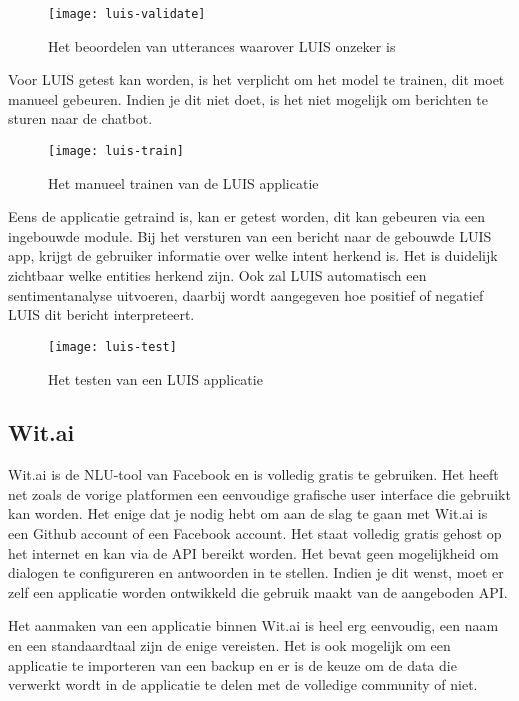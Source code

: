 \begin{figure}[H]
    \label{fig:luis-validate}
    \centering
    \texttt{[image: luis-validate]}
    \caption{Het beoordelen van utterances waarover LUIS onzeker is}
\end{figure}

Voor LUIS getest kan worden, is het verplicht om het model te trainen, dit moet manueel gebeuren. Indien je dit niet doet, is het niet mogelijk om berichten te sturen naar de chatbot.

\begin{figure}[H]
    \label{fig:luis-train}
    \centering
    \texttt{[image: luis-train]}
    \caption{Het manueel trainen van de LUIS applicatie}
\end{figure}

Eens de applicatie getraind is, kan er getest worden, dit kan gebeuren via een ingebouwde module. Bij het versturen van een bericht naar de gebouwde LUIS app, krijgt de gebruiker informatie over welke intent herkend is.
Het is duidelijk zichtbaar welke entities herkend zijn. Ook zal LUIS automatisch een sentimentanalyse uitvoeren, daarbij wordt aangegeven hoe positief of negatief LUIS dit bericht interpreteert.

\begin{figure}[H]
    \label{fig:luis-test}
    \centering
    \texttt{[image: luis-test]}
    \caption{Het testen van een LUIS applicatie}
\end{figure}

\subsection{Wit.ai}
\label{subsec:werking-platformen-wit}

Wit.ai is de NLU-tool van Facebook en is volledig gratis te gebruiken. Het heeft net zoals de vorige platformen een eenvoudige grafische user interface die gebruikt kan worden. Het enige dat je nodig hebt om aan de slag te gaan met Wit.ai is een Github account of een Facebook account. Het staat volledig gratis gehost op het internet en kan via de API bereikt worden. Het bevat geen mogelijkheid om dialogen te configureren en antwoorden in te stellen. Indien je dit wenst, moet er zelf een applicatie worden ontwikkeld die gebruik maakt van de aangeboden API.

Het aanmaken van een applicatie binnen Wit.ai is heel erg eenvoudig, een naam en een standaardtaal zijn de enige vereisten. Het is ook mogelijk om een applicatie te importeren van een backup en er is de keuze om de data die verwerkt wordt in de applicatie te delen met de volledige community of niet.

